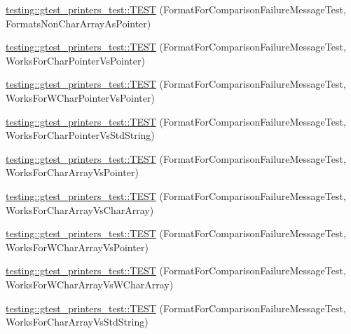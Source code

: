 \begin{DoxyCompactItemize}
\item 
\hyperlink{namespacetesting_1_1gtest__printers__test_a3571808f93f419268b6aed1aa127ea30}{testing\-::gtest\-\_\-printers\-\_\-test\-::\-T\-E\-S\-T} (Format\-For\-Comparison\-Failure\-Message\-Test, Formats\-Non\-Char\-Array\-As\-Pointer)
\item 
\hyperlink{namespacetesting_1_1gtest__printers__test_a1694d4063da702f5379495d3cb2cbc91}{testing\-::gtest\-\_\-printers\-\_\-test\-::\-T\-E\-S\-T} (Format\-For\-Comparison\-Failure\-Message\-Test, Works\-For\-Char\-Pointer\-Vs\-Pointer)
\item 
\hyperlink{namespacetesting_1_1gtest__printers__test_a735171f4ba0a9dffee9c4c7321107822}{testing\-::gtest\-\_\-printers\-\_\-test\-::\-T\-E\-S\-T} (Format\-For\-Comparison\-Failure\-Message\-Test, Works\-For\-W\-Char\-Pointer\-Vs\-Pointer)
\item 
\hyperlink{namespacetesting_1_1gtest__printers__test_ab5a910170489276c14b817b70d4feb96}{testing\-::gtest\-\_\-printers\-\_\-test\-::\-T\-E\-S\-T} (Format\-For\-Comparison\-Failure\-Message\-Test, Works\-For\-Char\-Pointer\-Vs\-Std\-String)
\item 
\hyperlink{namespacetesting_1_1gtest__printers__test_ac25834e0463cf9f3d231db24e7b220e5}{testing\-::gtest\-\_\-printers\-\_\-test\-::\-T\-E\-S\-T} (Format\-For\-Comparison\-Failure\-Message\-Test, Works\-For\-Char\-Array\-Vs\-Pointer)
\item 
\hyperlink{namespacetesting_1_1gtest__printers__test_aba32640344f0186de5fbb6bb47e0c5a5}{testing\-::gtest\-\_\-printers\-\_\-test\-::\-T\-E\-S\-T} (Format\-For\-Comparison\-Failure\-Message\-Test, Works\-For\-Char\-Array\-Vs\-Char\-Array)
\item 
\hyperlink{namespacetesting_1_1gtest__printers__test_a1e95289500400eff5fdcd45c5864a6d2}{testing\-::gtest\-\_\-printers\-\_\-test\-::\-T\-E\-S\-T} (Format\-For\-Comparison\-Failure\-Message\-Test, Works\-For\-W\-Char\-Array\-Vs\-Pointer)
\item 
\hyperlink{namespacetesting_1_1gtest__printers__test_af4b502fb5745d2ee0bfb81d1c8eb95f6}{testing\-::gtest\-\_\-printers\-\_\-test\-::\-T\-E\-S\-T} (Format\-For\-Comparison\-Failure\-Message\-Test, Works\-For\-W\-Char\-Array\-Vs\-W\-Char\-Array)
\item 
\hyperlink{namespacetesting_1_1gtest__printers__test_ac2300073f401f783ff7b1ef97d2cbd6d}{testing\-::gtest\-\_\-printers\-\_\-test\-::\-T\-E\-S\-T} (Format\-For\-Comparison\-Failure\-Message\-Test, Works\-For\-Char\-Array\-Vs\-Std\-String)
\item 

\end{DoxyCompactItemize}
